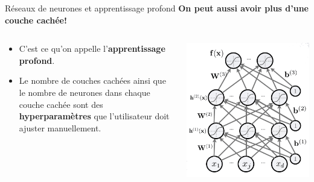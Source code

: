 \documentclass[french]{beamer}
\begin{document}
\begin{frame}{Réseaux de neurones et apprentissage profond}
\textbf{On peut aussi avoir plus d'une couche cachée!}
\begin{columns}[T]
\begin{column}{.48\textwidth}
\begin{itemize}
	\item C'est ce qu'on appelle l'\textbf{apprentissage profond}.
	\item Le nombre de couches cachées ainsi que le nombre de neurones dans chaque couche cachée sont des \textbf{hyperparamètres} que l'utilisateur doit ajuster manuellement.
\end{itemize}
\end{column}
\hfill
\begin{column}{.48\textwidth}
\includegraphics[width=\textwidth]{figures/deep_nn}
\end{column}
\end{columns}
\end{frame}
\end{document}
